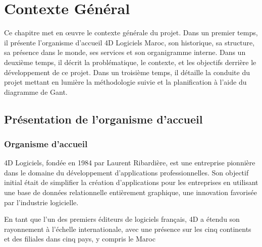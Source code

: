 
\chapter{Contexte Général}
\pagestyle{chapterstyle}
Ce chapitre met en œuvre le contexte générale du projet. Dans un premier temps, il
présente l’organisme d’accueil 4D Logiciels Maroc, son historique, sa structure, sa présence
dans le monde, ses services et son organigramme interne. Dans un deuxième temps, il décrit
la problématique, le contexte, et les objectifs derrière le développement de ce projet. Dans
un troisième temps, il détaille la conduite du projet mettant en lumière la méthodologie
suivie et la planification à l’aide du diagramme de Gant.



\newpage
\vspace{1cm}



\section{Présentation de l’organisme d’accueil}
\subsection{Organisme d'accueil}

4D Logiciels, fondée en 1984 par Laurent Ribardière, est une entreprise pionnière dans
le domaine du développement d’applications professionnelles. Son objectif initial était de
simplifier la création d’applications pour les entreprises en utilisant une base de données
relationnelle entièrement graphique, une innovation favorisée par l’industrie logicielle.
\newline

En tant que l’un des premiers éditeurs de logiciels français, 
4D a étendu son rayonnement à l’échelle internationale, avec 
une présence sur les cinq continents et des filiales
dans cinq pays, y compris le Maroc


